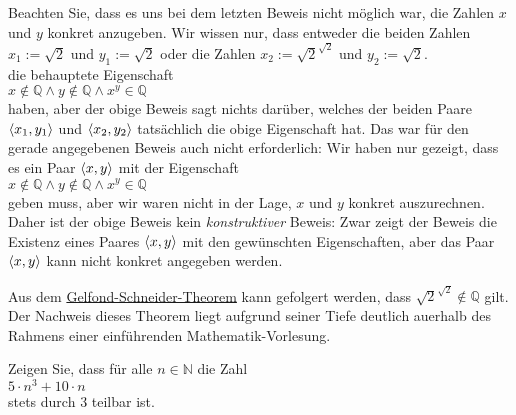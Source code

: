 Beachten Sie, dass es uns bei dem letzten Beweis nicht m\"{o}glich war, die Zahlen $x$ und $y$ konkret
anzugeben.  Wir wissen nur, dass entweder die beiden Zahlen
\\[0.2cm]
\hspace*{1.3cm}
$x_1 := \sqrt{2}$ und $y_1 := \sqrt{2}$ \quad oder \quad die Zahlen $x_2 := \sqrt{2}^{\sqrt{2}}$ und $y_2 := \sqrt{2}$.
\\[0.2cm]
die behauptete Eigenschaft 
\\[0.2cm]
\hspace*{1.3cm}
$x \not\in \mathbb{Q} \wedge y \not\in \mathbb{Q} \wedge x^y \in \mathbb{Q}$
\\[0.2cm]
haben, aber der obige Beweis sagt nichts dar\"{u}ber, welches der beiden Paare $\pair(x_1,y_1)$ und
$\pair(x_2,y_2)$ tats\"{a}chlich die obige Eigenschaft hat.  Das war f\"{u}r den gerade angegebenen Beweis
auch nicht erforderlich: Wir haben nur gezeigt, dass es ein Paar $\pair(x,y)$ mit der Eigenschaft
\\[0.2cm]
\hspace*{1.3cm}
$x \not\in \mathbb{Q} \wedge y \not\in \mathbb{Q} \wedge x^y \in \mathbb{Q}$
\\[0.2cm]
geben muss, aber wir waren nicht in der Lage, $x$ und $y$ konkret auszurechnen.  Daher ist der obige
Beweis kein \emph{konstruktiver} Beweis:  Zwar zeigt der Beweis die Existenz eines Paares
$\pair(x,y)$ mit den gew\"{u}nschten Eigenschaften, aber das Paar $\pair(x,y)$ kann nicht konkret
angegeben werden.

\remark
Aus dem \href{http://en.wikipedia.org/wiki/Gelfond%27s_theorem}{Gelfond-Schneider-Theorem}
kann gefolgert werden, dass $\sqrt{2}^{\sqrt{2}} \not\in \mathbb{Q}$ gilt.  Der Nachweis dieses
Theorem liegt aufgrund seiner Tiefe deutlich au\3erhalb des Rahmens einer einf\"{u}hrenden Mathematik-Vorlesung.

\exercise
Zeigen Sie, dass f\"{u}r alle $n \in \mathbb{N}$ die Zahl
\\[0.2cm]
\hspace*{1.3cm}
$5 \cdot n^3 + 10 \cdot n$
\\[0.2cm]
stets durch $3$ teilbar ist.  \exend

%
%

